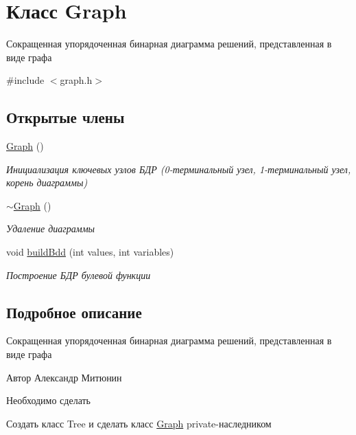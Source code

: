 \hypertarget{class_graph}{}\section{Класс Graph}
\label{class_graph}


Сокращенная упорядоченная бинарная диаграмма решений, представленная в виде графа  




{\ttfamily \#include $<$graph.\+h$>$}

\subsection*{Открытые члены}
\begin{DoxyCompactItemize}
\item 
\hyperlink{class_graph_ae4c72b8ac4d693c49800a4c7e273654f}{Graph} ()
\begin{DoxyCompactList}\small\item\em Инициализация ключевых узлов БДР (0-\/терминальный узел, 1-\/терминальный узел, корень диаграммы) \end{DoxyCompactList}\item 
\hyperlink{class_graph_a902c5b3eacb66d60752525ab23297a95}{$\sim$\+Graph} ()
\begin{DoxyCompactList}\small\item\em Удаление диаграммы \end{DoxyCompactList}\item 
void \hyperlink{class_graph_a675ba6677488ad224ff32d0fde0644c5}{build\+Bdd} (int values, int variables)
\begin{DoxyCompactList}\small\item\em Построение БДР булевой функции \end{DoxyCompactList}\end{DoxyCompactItemize}


\subsection{Подробное описание}
Сокращенная упорядоченная бинарная диаграмма решений, представленная в виде графа 

\begin{DoxyAuthor}{Автор}
Александр Митюнин 
\end{DoxyAuthor}
\begin{DoxyRefDesc}{Необходимо сделать}
\item[\hyperlink{todo__todo000004}{Необходимо сделать}]Создать класс Tree и сделать класс \hyperlink{class_graph}{Graph} private-\/наследником \end{DoxyRefDesc}


